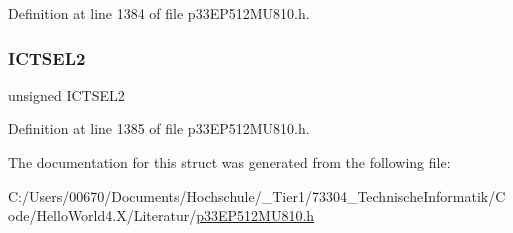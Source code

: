 Definition at line 1384 of file p33\+E\+P512\+M\+U810.\+h.

\mbox{\label{structtag_i_c16_c_o_n1_b_i_t_s_a47d80892d449e6edbd5ba2ba9ff06deb}} 
\subsubsection{\texorpdfstring{I\+C\+T\+S\+E\+L2}{ICTSEL2}}
{\footnotesize\ttfamily unsigned I\+C\+T\+S\+E\+L2}



Definition at line 1385 of file p33\+E\+P512\+M\+U810.\+h.



The documentation for this struct was generated from the following file\+:\begin{DoxyCompactItemize}
\item 
C\+:/\+Users/00670/\+Documents/\+Hochschule/\+\_\+\+Tier1/73304\+\_\+\+Technische\+Informatik/\+Code/\+Hello\+World4.\+X/\+Literatur/\hyperlink{p33_e_p512_m_u810_8h}{p33\+E\+P512\+M\+U810.\+h}\end{DoxyCompactItemize}
